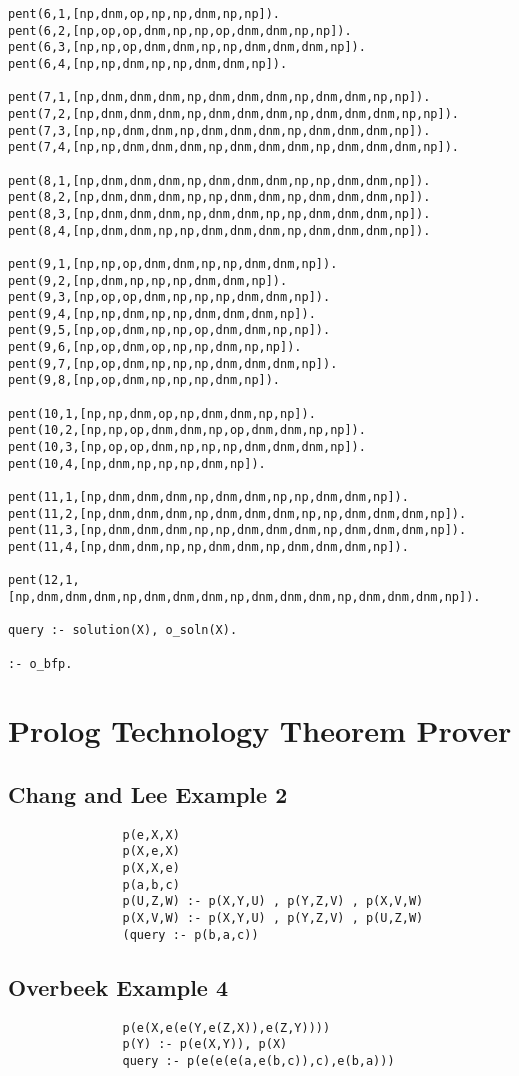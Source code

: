 \begin{verbatim}
pent(6,1,[np,dnm,op,np,np,dnm,np,np]).
pent(6,2,[np,op,op,dnm,np,np,op,dnm,dnm,np,np]).
pent(6,3,[np,np,op,dnm,dnm,np,np,dnm,dnm,dnm,np]).
pent(6,4,[np,np,dnm,np,np,dnm,dnm,np]).

pent(7,1,[np,dnm,dnm,dnm,np,dnm,dnm,dnm,np,dnm,dnm,np,np]).
pent(7,2,[np,dnm,dnm,dnm,np,dnm,dnm,dnm,np,dnm,dnm,dnm,np,np]).
pent(7,3,[np,np,dnm,dnm,np,dnm,dnm,dnm,np,dnm,dnm,dnm,np]).
pent(7,4,[np,np,dnm,dnm,dnm,np,dnm,dnm,dnm,np,dnm,dnm,dnm,np]).

pent(8,1,[np,dnm,dnm,dnm,np,dnm,dnm,dnm,np,np,dnm,dnm,np]).
pent(8,2,[np,dnm,dnm,dnm,np,np,dnm,dnm,np,dnm,dnm,dnm,np]).
pent(8,3,[np,dnm,dnm,dnm,np,dnm,dnm,np,np,dnm,dnm,dnm,np]).
pent(8,4,[np,dnm,dnm,np,np,dnm,dnm,dnm,np,dnm,dnm,dnm,np]).

pent(9,1,[np,np,op,dnm,dnm,np,np,dnm,dnm,np]).
pent(9,2,[np,dnm,np,np,np,dnm,dnm,np]).
pent(9,3,[np,op,op,dnm,np,np,np,dnm,dnm,np]).
pent(9,4,[np,np,dnm,np,np,dnm,dnm,dnm,np]).
pent(9,5,[np,op,dnm,np,np,op,dnm,dnm,np,np]).
pent(9,6,[np,op,dnm,op,np,np,dnm,np,np]).
pent(9,7,[np,op,dnm,np,np,np,dnm,dnm,dnm,np]).
pent(9,8,[np,op,dnm,np,np,np,dnm,np]).

pent(10,1,[np,np,dnm,op,np,dnm,dnm,np,np]).
pent(10,2,[np,np,op,dnm,dnm,np,op,dnm,dnm,np,np]).
pent(10,3,[np,op,op,dnm,np,np,np,dnm,dnm,dnm,np]).
pent(10,4,[np,dnm,np,np,np,dnm,np]).

pent(11,1,[np,dnm,dnm,dnm,np,dnm,dnm,np,np,dnm,dnm,np]).
pent(11,2,[np,dnm,dnm,dnm,np,dnm,dnm,dnm,np,np,dnm,dnm,dnm,np]).
pent(11,3,[np,dnm,dnm,dnm,np,np,dnm,dnm,dnm,np,dnm,dnm,dnm,np]).
pent(11,4,[np,dnm,dnm,np,np,dnm,dnm,np,dnm,dnm,dnm,np]).

pent(12,1,[np,dnm,dnm,dnm,np,dnm,dnm,dnm,np,dnm,dnm,dnm,np,dnm,dnm,dnm,np]).

query :- solution(X), o_soln(X).

:- o_bfp.
\end{verbatim}

\section{Prolog Technology Theorem Prover} %
\label{pttp_benchmark}

\subsection{Chang and Lee Example 2}

\begin{verbatim}
                p(e,X,X)
                p(X,e,X)
                p(X,X,e)
                p(a,b,c)
                p(U,Z,W) :- p(X,Y,U) , p(Y,Z,V) , p(X,V,W)
                p(X,V,W) :- p(X,Y,U) , p(Y,Z,V) , p(U,Z,W)
                (query :- p(b,a,c))
\end{verbatim}
 
\subsection{Overbeek Example 4}

\begin{verbatim}
                p(e(X,e(e(Y,e(Z,X)),e(Z,Y))))
                p(Y) :- p(e(X,Y)), p(X)
                query :- p(e(e(e(a,e(b,c)),c),e(b,a)))
\end{verbatim}